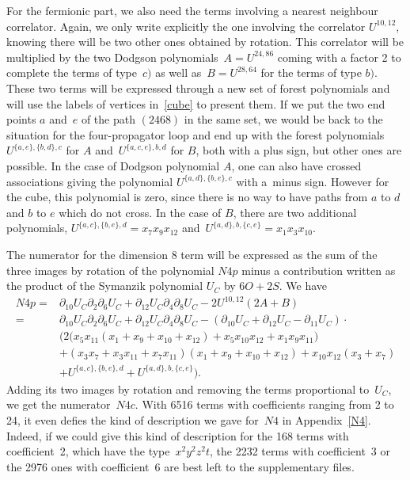 \documentclass[pdftex]{sigma}
\numberwithin{equation}{section}
\begin{document}
For the fermionic part, we also need the terms involving a nearest neighbour correlator.
Again, we only write explicitly the one involving the correlator $U^{10,12}$, knowing there will be two other ones
obtained by rotation. This correlator will be multiplied by the two Dodgson polynomials~${A = U^{2 4,8 6}}$ coming with a
factor 2 to complete the terms of type~$c)$ as well as~${B=U^{2 8,6 4}}$ for the terms of type $b)$. These two terms
will be expressed through a new set of forest polynomials and will use the labels of vertices in~\eqref{cube} to
present them. If we put the two end points $a$ and~$e$ of the path $(2 4 6 8)$ in the same set, we would be back
to the situation for the four-propagator loop and end up with the forest polynomials $U^{\{a,e\},\{b,d\},c}$ for $A$
and~$U^{\{a,c,e\},b,d}$ for $B$, both with a plus sign, but other ones are possible. In the case of Dodgson polynomial
$A$, one can also have crossed associations giving the polynomial $U^{\{a,d\},\{b,e\},c}$ with a~minus sign. However for
the cube, this polynomial is zero, since there is no way to have paths from $a$ to $d$ and $b$ to $e$ which do not
cross. In the case of $B$, there are two additional polynomials, $U^{\{a,c\},\{b,e\},d}=x_7 x_9 x_{12}$
and~$U^{\{a,d\},b,\{c,e\}} = x_1 x_3 x_{10}$.

The numerator for the dimension 8 term will be expressed as the sum of the three images by rotation of the polynomial
$N4p$ minus a contribution written as the product of the Symanzik polynomial $U_C$ by $6 O + 2 S$. We have
\begin{align*}
 N4p ={}& \partial_{10} U_C \partial_2 \partial_6 U_C + \partial_{12} U_C \partial_4\partial_8 U_C -
	2 U^{10,12} (2 A + B) \\
	={}& \partial_{10} U_C \partial_2 \partial_6 U_C + \partial_{12} U_C \partial_4\partial_8 U_C -
		(\partial_{10} U_C + \partial_{12} U_C - \partial_{11} U_C) \cdot \\
	&	( 2 \bigl( x_5 x_{11} (x_1 + x_9 + x_{10} + x_{12}) + x_5 x_{10} x_{12} + x_1 x_9 x_{11} \bigr) \\
	& +	(x_3 x_7 +x_3 x_{11} + x_7 x_{11}) ( x_1 + x_9 + x_{10} + x_{12}) + x_{10} x_{12}(x_3 + x_7) \\
	& + U^{\{a,c\},\{b,e\},d} + U^{\{a,d\},b,\{c,e\}} \bigr).
\end{align*}
Adding its two images by rotation and removing the terms proportional to~$U_C$, we get the numerator~$N4c$.
With 6516 terms with coefficients ranging from 2 to 24, it even defies the kind of description we gave for~$N4$ in
Appendix~\ref{N4}. Indeed, if we could give this kind of description for the 168 terms with coefficient~2, which have
the type~$x^2y^2z^2t$, the 2232 terms with coefficient~3 or the 2976 ones with coefficient~6 are best left to the
supplementary files.
\end{document}
